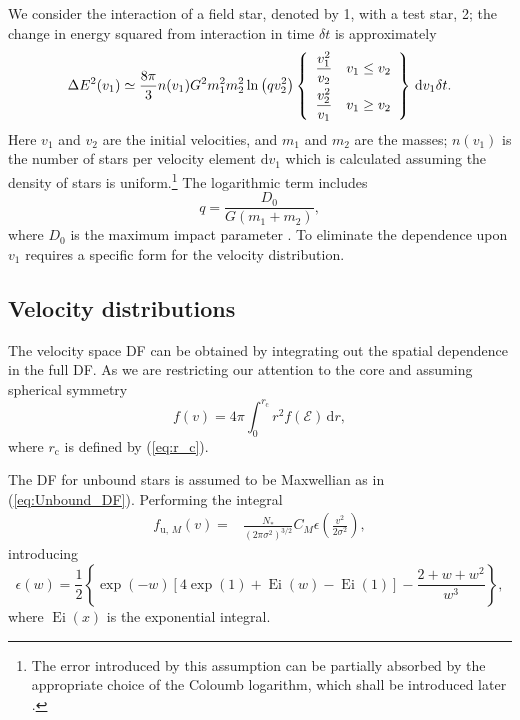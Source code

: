 \documentclass[useAMS,usedcolumn,usegraphicx,usenatbib]{mn2e}
\newcommand{\eqnref}[1]{(\ref{eq:#1})}
\DeclareMathOperator{\Ei}{Ei}
\newcommand{\sub}[1]{\ensuremath{_\mathrm{#1}}}
\newcommand{\dd}{\ensuremath{\mathrm{d}}}
\newcommand{\intd}[4]{\ensuremath{\displaystyle \int_{#1}^{#2}{#3}\,\dd{#4}}}
\newcommand{\recip}[1]{\ensuremath{\dfrac{1}{#1}}}
\begin{document}
\begin{onecolumn}
We consider the interaction of a field star, denoted by 1, with a test star, 2; the change in energy squared from interaction in time $\delta t$ is approximately \citep[chapter 2]{Chandrasekhar1960}
\begin{equation}
\Delta E^2(v_1) \simeq \frac{8\pi}{3} n(v_1)G^2m_1^2 m_2^2\ln\left(qv_2^2\right)\left\{\begin{array}{lr}\dfrac{v_1^2}{v_2}\vspace{1.0mm} & v_1 \leq v_2\\ \dfrac{v_2^2}{v_1} & v_1 \geq v_2 \end{array}\right\}\,\dd v_1\delta t.
\end{equation}
Here $v_1$ and $v_2$ are the initial velocities, and $m_1$ and $m_2$ are the masses; $n(v_1)$ is the number of stars per velocity element $\dd v_1$ which is calculated assuming the density of stars is uniform.\footnote{The error introduced by this assumption can be partially absorbed by the appropriate choice of the Coloumb logarithm, which shall be introduced later \citep{Just2011}.} The logarithmic term includes
\begin{equation}
q = \frac{D_0}{G\left(m_1+m_2\right)},
\end{equation}
where $D_0$ is the maximum impact parameter \citep{Weinberg1986}. To eliminate the dependence upon $v_1$ requires a specific form for the velocity distribution.

\subsection{Velocity distributions}

The velocity space DF can be obtained by integrating out the spatial dependence in the full DF. As we are restricting our attention to the core and assuming spherical symmetry
\begin{equation}
f(v) = 4\pi\intd{0}{r\sub{c}}{r^2f(\mathcal{E})}{r},
\end{equation}
where $r\sub{c}$ is defined by \eqnref{r_c}.

The DF for unbound stars is assumed to be Maxwellian as in \eqnref{Unbound_DF}. Performing the integral
\begin{align}
f_{\mathrm{u},\,M}(v) = {} & \frac{N_\ast}{\left(2\pi\sigma^2\right)^{3/2}}C_M\epsilon\left(\frac{v^2}{2\sigma^2}\right),
\end{align}
introducing
\begin{equation}
\epsilon(w) = \recip{2}\left\{\exp(-w)\left[4\exp(1) + \Ei(w) - \Ei(1)\right] - \frac{2 + w + w^2}{w^3}\right\},
\end{equation}
where $\Ei(x)$ is the exponential integral.


\end{onecolumn}
\end{document}
